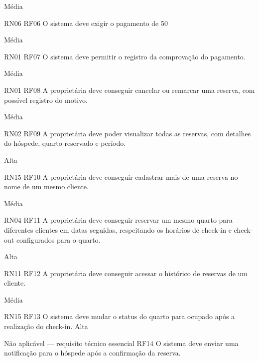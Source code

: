 Média
	







RN06
	  RF06
	O sistema deve exigir o pagamento de 50%
	







Média
	







RN01
	RF07
	O sistema deve permitir o registro da comprovação do pagamento.
	

Média
	

RN01 
	RF08
	A proprietária deve conseguir cancelar ou remarcar uma reserva, com possível registro do motivo.
	



Média
	



RN02 
	RF09
	A proprietária deve poder visualizar todas as reservas, com detalhes do hóspede, quarto reservado e período.
	



Alta
	



RN15 
	RF10
	A proprietária deve conseguir cadastrar mais de uma reserva no nome de um mesmo cliente.
	



Média
	



RN04 
	RF11
	A proprietária deve conseguir reservar um mesmo quarto para diferentes clientes em datas seguidas, respeitando os horários de check-in e check-out configurados para o quarto.
	







Alta
	







RN11
	RF12
	A proprietária deve conseguir acessar o histórico de reservas de um cliente.
	

Média
	

RN15
	RF13
	O sistema deve mudar o status do quarto para ocupado após a realização do check-in.
	Alta
	

Não aplicável — requisito técnico essencial
	RF14
	O sistema deve enviar uma notificação para o hóspede após a confirmação da reserva.
	




